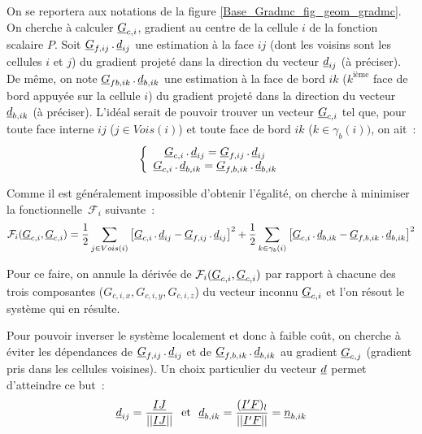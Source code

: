 On se reportera aux notations de la figure \ref{Base_Gradmc_fig_geom_gradmc}.
On cherche \`a calculer $\underline{G}_{c,i}$, gradient au centre de la cellule $i$ de la
fonction scalaire $P$. Soit  $\underline{G}_{f,ij}\,.\,\underline{d}_{ij}$ une estimation
\`a la face $ij$ (dont les voisins sont les cellules $i$ et $j$)
du gradient projet\'e dans la direction du vecteur $\underline{d}_{ij}$ (\`a pr\'eciser).
De m\^eme, on note
$\underline{G}_{fb,ik}\,.\,\underline{d}_{b,ik}$ une estimation  \`a la face de bord $ik$
($k^{\text{i\`eme}}$ face de bord appuy\'ee sur la cellule $i$) du gradient projet\'e dans
la direction du vecteur $\underline{d}_{b,ik}$ (\`a pr\'eciser).
L'id\'eal serait de pouvoir trouver un vecteur $\underline{G}_{c,i}$ tel que, pour toute
face interne $ij$ ($j\in Vois(i)$) et toute face de bord $ik$
($k\in\gamma_b(i))$, on ait~:
\begin{equation}
\left\{\begin{array}{c}
\underline{G}_{c,i}\,.\,\underline{d}_{ij}=\underline{G}_{f,ij}\,.\,\underline{d}_{ij}\\
\underline{G}_{c,i}\,.\,\underline{d}_{b,ik}=\underline{G}_{f,b,ik}\,.\,\underline{d}_{b,ik}
\end{array}\right.
\end{equation}




Comme il est g\'en\'eralement impossible d'obtenir l'\'egalit\'e, on cherche
\`a minimiser la fonctionnelle~$\mathcal{F}_i$ suivante~:
\begin{equation}\label{Base_Gradmc_eq_fonctionnelle_gradmc}
\mathcal{F}_i(\underline{G}_{c,i},\underline{G}_{c,i})=
\frac{1}{2}\sum\limits_{j\in Vois(i)}\left[
\underline{G}_{c,i}\,.\,\underline{d}_{ij}-\underline{G}_{f,ij}\,.\,\underline{d}_{ij}
\right]^2+
\frac{1}{2}\sum\limits_{k\in \gamma_b(i)}\left[
\underline{G}_{c,i}\,.\,\underline{d}_{b,ik}-\underline{G}_{f,b,ik}\,.\,\underline{d}_{b,ik}
\right]^2
\end{equation}

Pour ce faire, on annule la d\'eriv\'ee de
$\mathcal{F}_i(\underline{G}_{c,i},\underline{G}_{c,i})$
par rapport \`a
chacune des trois composantes ($G_{c,i,x}, G_{c,i,y}, G_{c,i,z}$) du vecteur
inconnu $\underline{G}_{c,i}$ et l'on r\'esout le syst\`eme qui en r\'esulte.

Pour pouvoir inverser le syst\`eme localement et donc \`a faible co\^ut, on
cherche \`a \'eviter les d\'ependances de $\underline{G}_{f,ij}\,.\,\underline{d}_{ij}$ et
de $\underline{G}_{f,b,ik}\,.\,\underline{d}_{b,ik}$ au gradient $\underline{G}_{c,j}$
(gradient pris dans les cellules voisines). Un choix particulier du vecteur
$\underline{d}$ permet d'atteindre ce but~:
\begin{equation}
\underline{d}_{ij} = \frac{\underline{IJ}}{||\underline{IJ}||} \text{\ \ et\ \ } \underline{d}_{b,ik} = \frac{(\underline{I'F})_l}{||\underline{I'F}||}=\underline{n}_{b,ik}
\end{equation}


